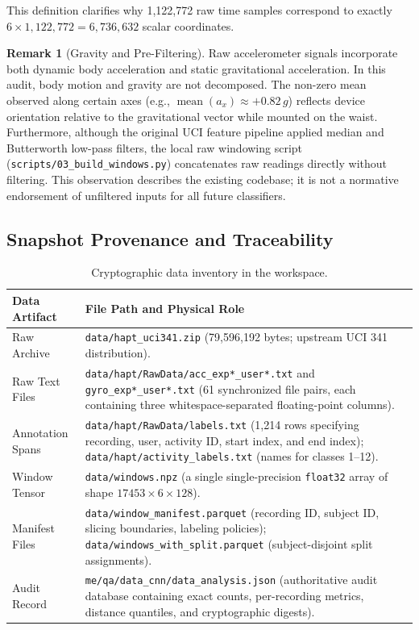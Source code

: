 \documentclass[11pt,a4paper]{article}
\newcommand{\code}[1]{{\small\ttfamily\nolinkurl{#1}}}
\theoremstyle{definition}
\newtheorem{remark}[proposition]{Remark}
\begin{document}
This definition clarifies why 1,122,772 raw time samples correspond to exactly $6 \times 1,122,772 = 6,736,632$ scalar coordinates.

\begin{remark}[Gravity and Pre-Filtering]
Raw accelerometer signals incorporate both dynamic body acceleration and static gravitational acceleration. In this audit, body motion and gravity are not decomposed. The non-zero mean observed along certain axes (e.g., $\operatorname{mean}(a_x) \approx +0.82\,g$) reflects device orientation relative to the gravitational vector while mounted on the waist. Furthermore, although the original UCI feature pipeline applied median and Butterworth low-pass filters, the local raw windowing script (\code{scripts/03_build_windows.py}) concatenates raw readings directly without filtering. This observation describes the existing codebase; it is not a normative endorsement of unfiltered inputs for all future classifiers.
\end{remark}

\subsection{Snapshot Provenance and Traceability}
\begin{table}[htbp]\centering\small
\begin{tabularx}{\linewidth}{@{}P{2.6cm}Y@{}}\toprule
Data Artifact & File Path and Physical Role\\\midrule
Raw Archive & \code{data/hapt_uci341.zip} (79,596,192 bytes; upstream UCI 341 distribution).\\
Raw Text Files & \code{data/hapt/RawData/acc_exp*\_user*.txt} and \code{gyro_exp*\_user*.txt} (61 synchronized file pairs, each containing three whitespace-separated floating-point columns).\\
Annotation Spans & \code{data/hapt/RawData/labels.txt} (1,214 rows specifying recording, user, activity ID, start index, and end index); \code{data/hapt/activity_labels.txt} (names for classes 1--12).\\
Window Tensor & \code{data/windows.npz} (a single single-precision \code{float32} array of shape $17453 \times 6 \times 128$).\\
Manifest Files & \code{data/window_manifest.parquet} (recording ID, subject ID, slicing boundaries, labeling policies); \code{data/windows_with_split.parquet} (subject-disjoint split assignments).\\
Audit Record & \code{me/qa/data_cnn/data_analysis.json} (authoritative audit database containing exact counts, per-recording metrics, distance quantiles, and cryptographic digests).\\\bottomrule
\end{tabularx}
\caption{Cryptographic data inventory in the workspace.}
\end{table}
\end{document}
